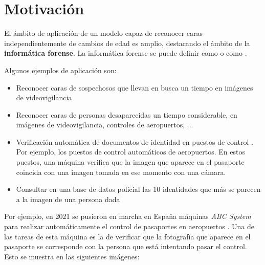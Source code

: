 \section{Motivación}

El ámbito de aplicación de un modelo capaz de reconocer caras independientemente de cambios de edad es amplio, destacando el ámbito de la \textbf{informática forense}. La informática forense se puede definir como  o como  \cite{informatica:libro_informatica_forense}.

Algunos ejemplos de aplicación son:

\begin{itemize}
	\item Reconocer caras de sospechosos que llevan en busca un tiempo en imágenes de videovigilancia
	\item Reconocer caras de personas desaparecidas un tiempo considerable, en imágenes de videovigilancia, controles de aeropuertos, ...
	\item Verificación automática de documentos de identidad en puestos de control \cite{informatica:tecnica_sintesis_aifr}. Por ejemplo, los puestos de control automáticos de aeropuertos. En estos puestos, una máquina verifica que la imagen que aparece en el pasaporte coincida con una imagen tomada en ese momento con una cámara.
	\item Consultar en una base de datos policial las 10 identidades que más se parecen a la imagen de una persona dada
\end{itemize}

Por ejemplo, en 2021 se pusieron en marcha en España máquinas \textit{ABC System} para realizar automáticamente el control de pasaportes en aeropuertos \cite{informatica:articulo_abc_system}. Una de las tareas de esta máquina es la de verificar que la fotografía que aparece en el pasaporte se corresponde con la persona que está intentando pasar el control. Esto se muestra en las siguientes imágenes:

